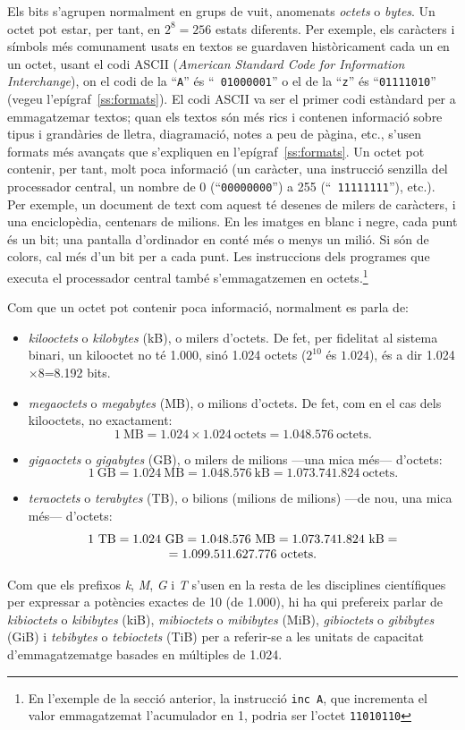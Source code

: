 Els bits s'agrupen normalment en grups de vuit, anomenats {\em octets}
o \emph{bytes}. Un octet pot estar, per tant, en $2^8=256$ estats
diferents. Per exemple, els caràcters i símbols més comunament usats
en textos se guardaven històricament cada un en un octet, usant el
codi ASCII\label{pg:ASCII} (\emph{American Standard Code for
  Information Interchange}), on el codi de la ``{\tt A}'' és ``{\tt
  01000001}'' o el de la ``{\tt z}'' és ``{\tt 01111010}'' (vegeu
l'epígraf~\ref{ss:formats}).  El codi ASCII va ser el primer codi
estàndard per a emmagatzemar textos; quan els textos són més rics i
contenen informació sobre tipus i grandàries de lletra, diagramació,
notes a peu de pàgina, etc., s'usen formats més avançats que
s'expliquen en l'epígraf~\ref{ss:formats}.  Un octet pot contenir, per
tant, molt poca informació (un caràcter, una instrucció senzilla del
processador central, un nombre de 0 (``{\tt 00000000}'') a 255 (``{\tt
  11111111}''), etc.).  Per exemple, un document de text com aquest té
desenes de milers de caràcters, i una enciclopèdia, centenars de
milions. En les imatges en blanc i negre, cada punt és un bit; una
pantalla d'ordinador en conté més o menys un milió. Si són de colors,
cal més d'un bit per a cada punt. Les instruccions dels programes que
executa el processador central també s'emmagatzemen en
octets.\footnote{En l'exemple de la secció anterior, la instrucció
  {\tt inc A}, que incrementa el valor emmagatzemat l'acumulador en 1,
  podria ser l'octet {\tt 11010110}}

Com que un octet pot contenir poca informació, normalment es parla de:
\begin{itemize}
\item \emph{kilooctets} o \emph{kilobytes} (kB), o milers d'octets.
  De fet, per fidelitat al sistema binari, un kilooctet no té 1.000,
  sinó 1.024 octets ($2^{10}$ és $1.024$), és a dir
  1.024$\times$8=8.192 bits.
\item \emph{megaoctets} o \emph{megabytes} (MB), o milions d'octets.
  De fet, com en el cas dels kilooctets, no exactament:
$$1~\mbox{MB} = 1.024 \times 1.024~\mbox{octets}= 1.048.576~\mbox{octets}.$$
\item \emph{gigaoctets} o \emph{gigabytes} (GB), o milers de milions
  ---una mica més--- d'octets:
$$1~\mbox{GB}=1.024~\mbox{MB}=1.048.576~\mbox{kB}=1.073.741.824~\mbox{octets}.$$
\item \emph{teraoctets} o \emph{terabytes} (TB), o bilions (milions de
  milions) ---de nou, una mica més--- d'octets:
\[
\begin{array}{c}
$$1~\mbox{TB}=1.024~\mbox{GB}=1.048.576~\mbox{MB}=1.073.741.824~\mbox{kB}=\\
=1.099.511.627.776~\mbox{octets}.$$
\end{array}
\]
\end{itemize}
Com que els prefixos \emph{k}, \emph{M}, \emph{G} i \emph{T} s'usen en
la resta de les disciplines científiques per expressar a potències
exactes de 10 (de 1.000), hi ha qui prefereix parlar de
\emph{kibioctets} o \emph{kibibytes} (kiB), \emph{mibioctets} o
\emph{mibibytes} (MiB), \emph{gibioctets} o \emph{gibibytes} (GiB) i
\emph{tebibytes} o \emph{tebioctets} (TiB) per a referir-se a les
unitats de capacitat d'emmagatzematge basades en múltiples de 1.024.

